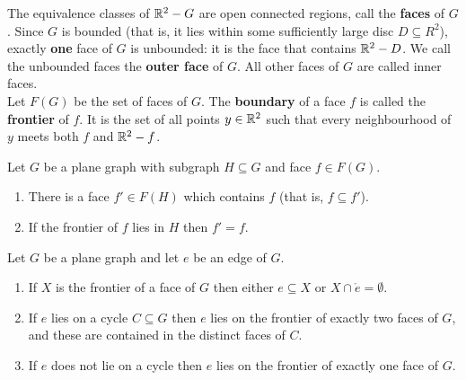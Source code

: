 The equivalence classes of \(\mathbb{R}^2 - G\) are open connected regions, call the \textbf{faces} of \(G\). Since \(G\) is bounded (that is, it lies within some sufficiently large disc \(D \subseteq R^2\)), exactly \textbf{one} face of \(G\) is unbounded: it is the face that contains \(\mathbb{R}^2 - D\). We call the unbounded faces the \textbf{outer face} of \(G\). All other faces of \(G\) are called inner faces. \\

Let \(F(G)\) be the set of faces of \(G\). The \textbf{boundary} of a face \(f\) is called the \textbf{frontier} of \(f\). It is the set of all points \(y \in \mathbb{R}^2\) such that every neighbourhood of \(y\) meets both \(f\) and \(\mathbb{R}^2 - f\).

\begin{lemma}
    Let \(G\) be a plane graph with subgraph \(H \subseteq G\) and face \(f \in F(G)\).
    \begin{enumerate}[label=(\roman*)]
        \item There is a face \(f' \in F(H)\) which contains \(f\) (that is, \(f \subseteq f'\)).
        \item If the frontier of \(f\) lies in \(H\) then \(f' = f\).
    \end{enumerate}
\end{lemma}

\begin{lemma}
    Let \(G\) be a plane graph and let \(e\) be an edge of \(G\).
    \begin{enumerate}[label=(\roman*)]
        \item If \(X\) is the frontier of a face of \(G\) then either \(e \subseteq X\) or \(X \cap \mathring{e} = \emptyset\).
        \item If \(e\) lies on a cycle \(C \subseteq G\) then \(e\) lies on the frontier of exactly two faces of \(G\), and these are contained in the distinct faces of \(C\).
        \item If \(e\) does not lie on a cycle then \(e\) lies on the frontier of exactly one face of \(G\).
    \end{enumerate}
\end{lemma}

